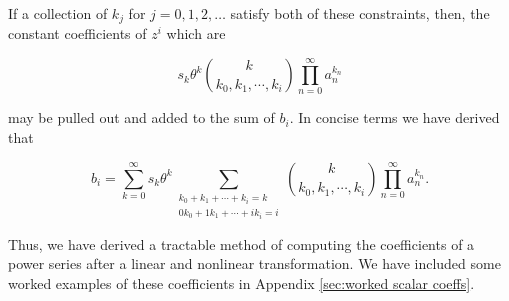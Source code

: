 If a collection of $k_j$ for $j = 0, 1, 2, \ldots$ satisfy both of these constraints, then, the constant coefficients of $z^i$ which are

\begin{equation*}
    s_k \theta^k \binom{k}{k_0, k_1, \cdots, k_i} \prod_{n=0}^{\infty} a_n^{k_n}
\end{equation*}

may be pulled out and added to the sum of $b_i$. In concise terms we have derived that

\begin{equation}
    b_i = \sum_{k=0}^{\infty} s_k \theta^k \sum_{\substack{k_0 + k_1 + \cdots + k_i = k \\ 0 k_0 + 1 k_1 + \cdots + i k_i = i}} \binom{k}{k_0, k_1, \cdots, k_i} \prod_{n=0}^{\infty} a_n^{k_n}.
	\label{eqn:scalar power series result}
\end{equation}

Thus, we have derived a tractable method of computing the coefficients of a power series after a linear and nonlinear transformation. We have included some worked examples of these coefficients in Appendix \ref{sec:worked scalar coeffs}.

